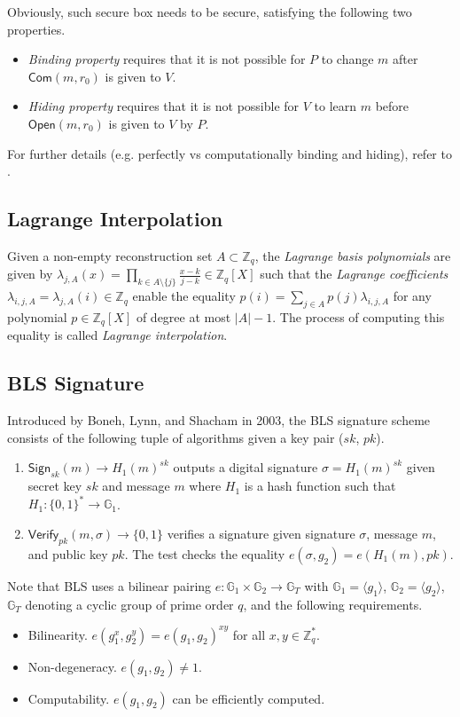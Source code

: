 \documentclass[letterpaper,twocolumn,10pt]{article}
\theoremstyle{definition}
\theoremstyle{remark}
\begin{document}
Obviously, such secure box needs to be secure, satisfying the following two properties.
\begin{itemize}
\item \textit{Binding property} requires that it is not possible for $P$ to change $m$ after $\mathsf{Com}(m, r_0)$ is given to $V$.
\item \textit{Hiding property} requires that it is not possible for $V$ to learn $m$ before $\mathsf{Open}(m, r_0)$ is given to $V$ by $P$.
\end{itemize}

For further details (e.g. perfectly vs computationally binding and hiding), refer to \cite{damgaard1998commitment}.

\subsection{Lagrange Interpolation}
\label{appendix:lagrange}
Given a non-empty reconstruction set $A \subset \mathbb{Z}_q$, the \textit{Lagrange basis polynomials} are given by $\lambda_{j, A}(x) = \prod_{k \in A \setminus \{j\}} \frac{x - k}{j - k} \in \mathbb{Z}_q[X]$ such that the \textit{Lagrange coefficients} $\lambda_{i, j, A} = \lambda_{j, A}(i) \in \mathbb{Z}_q$ enable the equality $p(i) = \sum_{j \in A} p(j) \lambda_{i, j, A}$ for any polynomial $p \in \mathbb{Z}_q[X]$ of degree at most $|A| - 1$. The process of computing this equality is called \textit{Lagrange interpolation}.

\subsection{BLS Signature}
\label{appendix:bls}
Introduced by Boneh, Lynn, and Shacham in 2003, the BLS signature scheme \cite{boneh2001short} consists of the following tuple of algorithms given a key pair ($sk$, $pk$).
\begin{enumerate}
\item $\mathsf{Sign}_{sk}(m) \rightarrow H_1(m)^{sk}$ outputs a digital signature $\sigma = H_1(m)^{sk}$ given secret key $sk$ and message $m$ where $H_1$ is a hash function such that $H_1: \{0, 1\}^* \rightarrow \mathbb{G}_1$.
\item $\mathsf{Verify}_{pk}(m, \sigma) \rightarrow \{0, 1\}$ verifies a signature given signature $\sigma$, message $m$, and public key $pk$. The test checks the equality $e(\sigma, g_2) = e(H_1(m), pk)$.
\end{enumerate}
Note that BLS uses a bilinear pairing $e: \mathbb{G}_1 \times \mathbb{G}_2 \rightarrow \mathbb{G}_T$ with $\mathbb{G}_1 = \langle g_1 \rangle$, $\mathbb{G}_2 = \langle g_2 \rangle$, $\mathbb{G}_T$ denoting a cyclic group of prime order $q$, and the following requirements.
\begin{itemize}
\item Bilinearity. $e(g_1^x, g_2^y) = e(g_1, g_2)^{x y}$ for all $x, y \in \mathbb{Z}^*_q$.
\item Non-degeneracy. $e(g_1, g_2) \neq 1$.
\item Computability. $e(g_1, g_2)$ can be efficiently computed.
\end{itemize}
\end{document}
